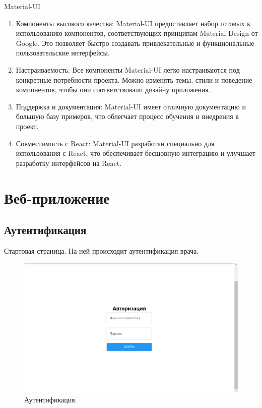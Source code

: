 \documentclass[a4paper,12pt]{article}
\begin{document}
    Material-UI
    \begin{enumerate}
        \item Компоненты высокого качества: Material-UI предоставляет набор готовых к использованию компонентов, соответствующих принципам Material Design от Google.
        Это позволяет быстро создавать привлекательные и функциональные пользовательские интерфейсы.

        \item Настраиваемость: Все компоненты Material-UI легко настраиваются под конкретные потребности проекта.
        Можно изменять темы, стили и поведение компонентов, чтобы они соответствовали дизайну приложения.

        \item Поддержка и документация: Material-UI имеет отличную документацию и большую базу примеров, что облегчает процесс обучения и внедрения в проект.

        \item Совместимость с React: Material-UI разработан специально для использования с React, что обеспечивает бесшовную интеграцию и улучшает разработку интерфейсов на React.

    \end{enumerate}

    \newpage
    \section{Веб-приложение}\label{sec:-2}

    \subsection{Аутентификация}\label{subsec:}
    Стартовая страница.
    На ней происходит аутентификация врача.
    \begin{figure}[h]
        \includegraphics[scale=0.25]{images/screenshots/auth}
        \caption{Аутентификация.}\label{fig:figure4}
    \end{figure}
\end{document}
